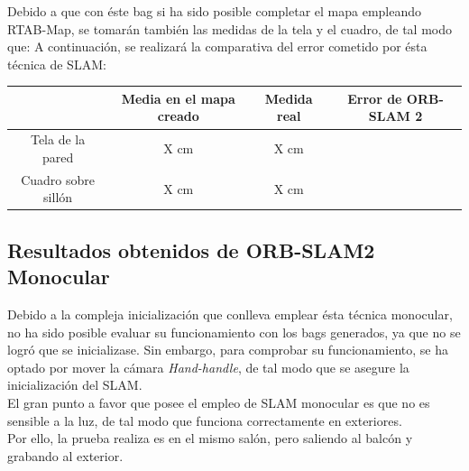 Debido a que con éste bag si ha sido posible completar el mapa empleando RTAB-Map, se tomarán también las medidas de la tela y el cuadro, de tal modo que:
A continuación, se realizará la comparativa del error cometido por ésta técnica de SLAM:
\begin{center}
    \begin{tabular}{ c | c | c | c }
         & Media en el mapa creado & Medida real & Error de ORB-SLAM 2\\
         \hline
         Tela de la pared & X cm & X cm \\
         Cuadro sobre sillón & X cm & X cm \\
    \end{tabular}
    \end{center}

\newpage
\subsection{Resultados obtenidos de ORB-SLAM2 Monocular}
Debido a la compleja inicialización que conlleva emplear ésta técnica monocular, no ha sido posible evaluar su funcionamiento con los bags generados, ya que no se logró que se
inicializase. Sin embargo, para comprobar su funcionamiento, se ha optado por mover la cámara \textit{Hand-handle}, de tal modo que se asegure la inicialización del SLAM. \\
El gran punto a favor que posee el empleo de SLAM monocular es que no es sensible a la luz, de tal modo que funciona correctamente en exteriores. \\
Por ello, la prueba realiza es en el mismo salón, pero saliendo al balcón y grabando al exterior. \\
